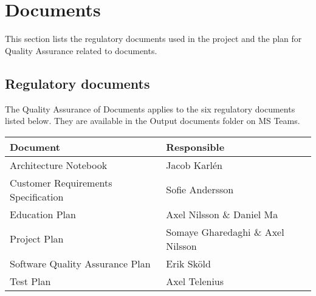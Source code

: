 \section{Documents}
This section lists the regulatory documents used in the project and the plan for Quality Assurance related to documents.

\subsection{Regulatory documents}
The Quality Assurance of Documents applies to the six regulatory documents listed below. They are available in the Output documents folder on MS Teams.

\begin{table}[!ht]
\centering
\begin{tabular}{ | l | l |}
    \hline
Document & Responsible\\
\hline
Architecture Notebook & Jacob Karlén\\
Customer Requirements Specification & Sofie Andersson\\
Education Plan & Axel Nilsson \& Daniel Ma\\
Project Plan & Somaye Gharedaghi \& Axel Nilsson\\
Software Quality Assurance Plan & Erik Sköld\\
Test Plan & Axel Telenius\\
\hline
\end{tabular}
\end{table}


